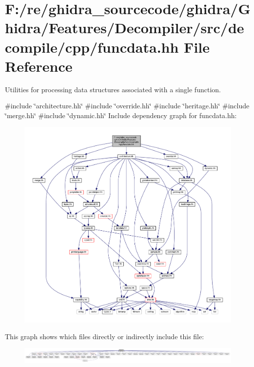 \hypertarget{funcdata_8hh}{}\section{F\+:/re/ghidra\+\_\+sourcecode/ghidra/\+Ghidra/\+Features/\+Decompiler/src/decompile/cpp/funcdata.hh File Reference}
\label{funcdata_8hh}


Utilities for processing data structures associated with a single function.  


{\ttfamily \#include \char`\"{}architecture.\+hh\char`\"{}}\newline
{\ttfamily \#include \char`\"{}override.\+hh\char`\"{}}\newline
{\ttfamily \#include \char`\"{}heritage.\+hh\char`\"{}}\newline
{\ttfamily \#include \char`\"{}merge.\+hh\char`\"{}}\newline
{\ttfamily \#include \char`\"{}dynamic.\+hh\char`\"{}}\newline
Include dependency graph for funcdata.\+hh\+:
\nopagebreak
\begin{figure}[H]
\begin{center}
\leavevmode
\includegraphics[width=350pt]{funcdata_8hh__incl}
\end{center}
\end{figure}
This graph shows which files directly or indirectly include this file\+:
\nopagebreak
\begin{figure}[H]
\begin{center}
\leavevmode
\includegraphics[width=350pt]{funcdata_8hh__dep__incl}
\end{center}
\end{figure}
